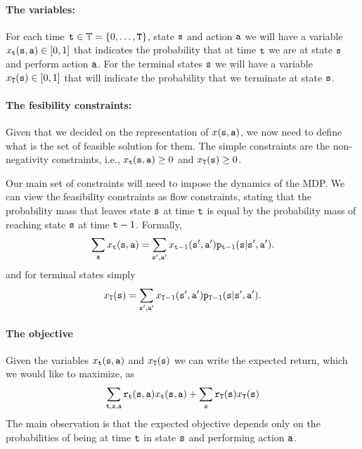 \paragraph{The variables:}
For each time ${\tt t}\in\mathbb{T}=\{0,\ldots, {\tt T}\}$, state ${\tt s}$ and action
${\tt a}$ we will have a variable
$x_{{\tt t}}({\tt s},{\tt a})\in[0,1]$ that indicates the
probability that at time ${\tt t}$ we are at state ${\tt s}$ and
perform action ${\tt a}$. For the terminal states ${\tt s}$ we will
have a variable $x_{{\tt T}}({\tt s})\in[0,1]$ that will indicate the probability that we terminate at state ${\tt s}$.

\paragraph{The fesibility constraints:}
Given that we decided on the representation of $x({\tt s},{\tt a})$, we now need to define what is the set of feasible solution for them.
%
The simple constraints are the non-negativity constraints, i.e., $x_{\tt t}({\tt s},{\tt a})\geq 0$ and $x_{\tt T}({\tt s})\geq 0$.


Our main set of constraints will need to impose the dynamics of the MDP.
We can view the feasibility constraints as flow constraints, stating that the
probability mass that leaves state ${\tt s}$ at time ${\tt t}$ is
equal by the probability mass of reaching state ${\tt s}$ at time
${\tt t}-1$.
%
Formally,
\[
\sum_{{\tt a}} x_{{\tt t}}({\tt s},{\tt a})=
\sum_{{\tt s}',{\tt a}'}
x_{{\tt t}-1}({\tt s}',{\tt a}'){\tt p}_{{\tt t}-1}({\tt s}|{\tt s}',{\tt a}').
\]
and for terminal states simply
\[
x_{{\tt T}}({\tt s})=\sum_{{\tt s}',{\tt a}'}
x_{{\tt T}-1}({\tt s}',{\tt a}'){\tt p}_{{\tt T}-1}({\tt s}|{\tt s}',{\tt a}').
\]




\paragraph{The objective}
Given the variables  $x_{\tt t}({\tt s},{\tt a})$ and $x_{\tt T}({\tt s})$ we can write the expected return, which we would like to maximize, as
\[
\sum_{{\tt t},{\tt s},{\tt a}}
{\tt r}_{{\tt t}}({\tt s},{\tt a})x_{{\tt t}}({\tt s},{\tt a})+\sum_{{\tt s}}{\tt r}_{{\tt T}}({\tt s})x_{{\tt T}}({\tt s})
\]
The main observation is that the expected objective depends only on the probabilities of being at time ${\tt t}$ in state ${\tt s}$ and performing action ${\tt a}$.



